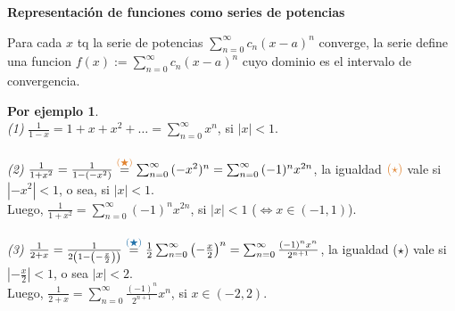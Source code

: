 \documentclass{article}
\theoremstyle{definition}
\newtheorem*{ej}{Por ejemplo}
\theoremstyle{remark}
\begin{document}
\begin{figure}[h]
\centering
\def\svgwidth{0.75\textwidth}

\end{figure}

\pagebreak


\begin{center}
  \textbf{Representación de funciones como series de potencias}
\end{center}
Para cada $x$ tq la serie de potencias $\sum_{n=0}^{\infty}{c_n(x-a)^n}$ converge, la serie define una funcion $f(x):=\sum_{n=0}^{\infty}{c_n(x-a)^n}$ cuyo dominio es el intervalo de convergencia. 

\begin{ej} \; \\ 
  \emph{(1)} \quad $\frac{1}{1-x}=1+x+x^2+\dots =\sum_{n=0}^{\infty}{x^n}$, si $|x|<1$. \\ \\
  \emph{(2)} \quad $\frac{1}{1+x^2}= \frac{1}{1-(-x^2)} \overset{\textcolor{rojop2}{(\bigstar)}}{=}\sum_{n=0}^{\infty}{(-x^2)^n}=\sum_{n=0}^{\infty}{(-1)^nx^{2n}}$, la igualdad $\textcolor{rojop2}{(\star)}$ vale si $|-x^2|<1$, o sea, si $|x|<1$. \\ Luego, $\frac{1}{1+x^2} = \sum_{n=0}^{\infty}{(-1)^nx^{2n}}$, si $|x|<1$ \big($\Leftrightarrow x \in (-1,1)$\big). \\\\
\emph{(3)} \quad $\frac{1}{2+x}=\frac{1}{2\left(1-\left(-\frac{x}{2}\right)\right)} \overset{\textcolor{azulp2}{(\bigstar)}}{=}\frac{1}{2}\sum_{n=0}^{\infty}{\left(-\frac{x}{2}\right)^n}=\sum_{n=0}^{\infty}{\frac{(-1)^nx^n}{2^{n+1}}}$, la igualdad \textcolor{azulp2}{($\star$)} vale si $\left|-\frac{x}{2}\right|<1$, o sea $|x|<2$. \\ Luego, $\frac{1}{2+x}=\sum_{n=0}^{\infty}{\frac{(-1)^n}{2^{n+1}}x^n}$, si $x \in (-2,2)$.
\end{ej}
\end{document}
